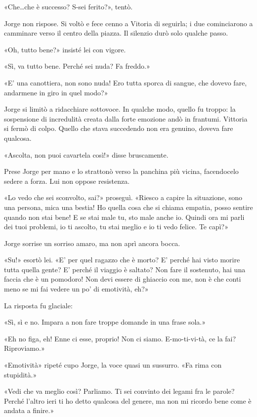 «Che\ldots che è successo? S-sei ferito?», tentò.

Jorge non rispose. Si voltò e fece cenno a Vitoria di seguirla; i due cominciarono a camminare verso il centro della piazza. Il silenzio durò solo qualche passo.

«Oh, tutto bene?» insisté lei con vigore.

«Sì, va tutto bene. Perché sei nuda? Fa freddo.»

«E' una canottiera, non sono nuda! Ero tutta sporca di sangue, che dovevo fare, andarmene in giro in quel modo?»

Jorge si limitò a ridacchiare sottovoce. In qualche modo, quello fu troppo: la sospensione di incredulità creata dalla forte emozione andò in frantumi. Vittoria si fermò di colpo. Quello che stava succedendo non era genuino, doveva fare qualcosa.

«Ascolta, non puoi cavartela così!» disse bruscamente.

Prese Jorge per mano e lo strattonò verso la panchina più vicina, facendocelo sedere a forza. Lui non oppose resistenza.

«Lo vedo che sei sconvolto, sai?» proseguì. «Riesco a capire la situazione, sono una persona, mica una bestia! Ho quella cosa che si chiama empatia, posso sentire quando non stai bene! E se stai male tu, sto male anche io. Quindi ora mi parli dei tuoi problemi, io ti ascolto, tu stai meglio e io ti vedo felice. Te capì?»

Jorge sorrise un sorriso amaro, ma non aprì ancora bocca.

«Su!» esortò lei. «E' per quel ragazzo che è morto? E' perché hai visto morire tutta quella gente? E' perché il viaggio è saltato? Non fare il sostenuto, hai una faccia che è un pomodoro! Non devi essere di ghiaccio con me, non è che conti meno se mi fai vedere un po' di emotività, eh?»

La risposta fu glaciale:

«Sì, sì e no. Impara a non fare troppe domande in una frase sola.»

«Eh no figa, eh! Enne ci esse, proprio! Non ci siamo. E-mo-ti-vi-tà, ce la fai? Riproviamo.»

«Emotività» ripeté cupo Jorge, la voce quasi un sussurro. «Fa rima con stupidità.»

«Vedi che va meglio così? Parliamo. Ti sei convinto dei legami fra le parole? Perché l'altro ieri ti ho detto qualcosa del genere, ma non mi ricordo bene come è andata a finire.»

